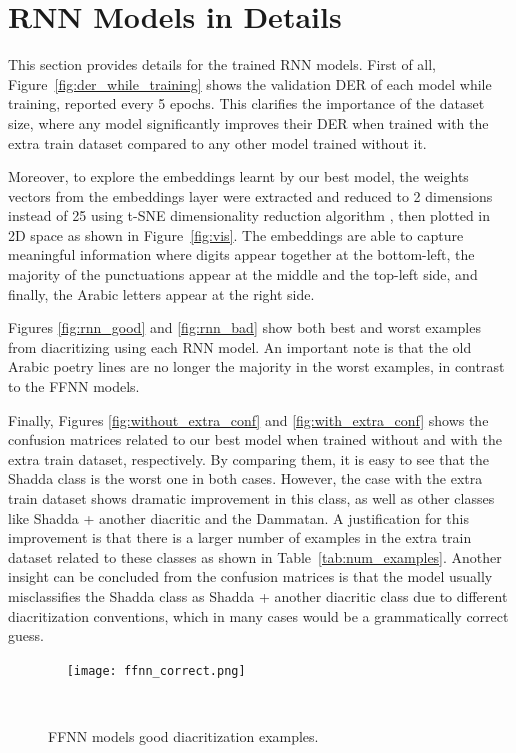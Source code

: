 \documentclass[11pt,a4paper]{article}
\begin{document}
\section{RNN Models in Details}
\label{app:b}

This section provides details for the trained RNN models. First of all, Figure~\ref{fig:der_while_training} shows the validation DER of each model while training, reported every 5 epochs. This clarifies the importance of the dataset size, where any model significantly improves their DER when trained with the extra train dataset compared to any other model trained without it.

Moreover, to explore the embeddings learnt by our best model, the weights vectors from the embeddings layer were extracted and reduced to 2 dimensions instead of 25 using t-SNE dimensionality reduction algorithm \cite{maaten2008visualizing}, then plotted in 2D space as shown in Figure~\ref{fig:vis}. The embeddings are able to capture meaningful information where digits appear together at the bottom-left, the majority of the punctuations appear at the middle and the top-left side, and finally, the Arabic letters appear at the right side.

Figures \ref{fig:rnn_good} and \ref{fig:rnn_bad} show both best and worst examples from diacritizing using each RNN model. An important note is that the old Arabic poetry lines are no longer the majority in the worst examples, in contrast to the FFNN models.

Finally, Figures \ref{fig:without_extra_conf} and \ref{fig:with_extra_conf} shows the confusion matrices related to our best model when trained without and with the extra train dataset, respectively. By comparing them, it is easy to see that the Shadda class is the worst one in both cases. However, the case with the extra train dataset shows dramatic improvement in this class, as well as other classes like Shadda + another diacritic and the Dammatan. A justification for this improvement is that there is a larger number of examples in the extra train dataset related to these classes as shown in Table~\ref{tab:num_examples}. Another insight can be concluded from the confusion matrices is that the model usually misclassifies the Shadda class as Shadda + another diacritic class due to different diacritization conventions, which in many cases would be a grammatically correct guess.



\begin{figure*}[h]
    \centering
    \texttt{[image: ffnn\_correct.png]}
    \caption{FFNN models good diacritization examples.}
    \label{fig:ffnn_good}
\end{figure*}
\end{document}
